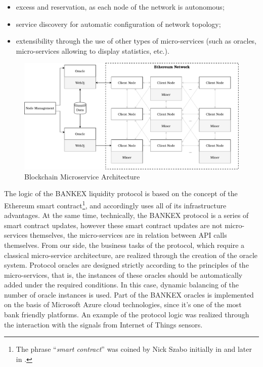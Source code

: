 \documentclass{article}
\begin{document}
\begin{multicols}{2}
\begin{itemize}
\item excess and reservation, as each node of the network is autonomous;
\item service discovery for automatic configuration of network topology;
\item extensibility through the use of other types of micro-services (such as oracles, micro-services allowing to display statistics, etc.).
\end{itemize}

\begin{figure}
  \centering
  \includegraphics[width=\textwidth]{blockchain-microservice-architecture.pdf}
  \caption{Blockchain Microservice Architecture}
  \label{fig:blockchain-microservice-architecture}
\end{figure}

The logic of the BANKEX liquidity protocol is based on the concept of the Ethereum smart contract\footnote{The phrase \enquote{\textit{smart contract}} was coined by Nick Szabo initially in \cite{szabo1996} and later in \cite{szabo1997}.}, and accordingly uses all of its infrastructure advantages. At the same time, technically, the BANKEX protocol is a series of smart contract updates, however these smart contract updates are not micro-services themselves, the micro-services are in relation between API calls themselves. From our side, the business tasks of the protocol, which require a classical micro-service architecture, are realized through the creation of the oracle system. Protocol oracles are designed strictly according to the principles of the micro-services, that is, the instances of these oracles should be automatically added under the required conditions. In this case, dynamic balancing of the number of oracle instances is used. Part of the BANKEX oracles is implemented on the basis of Microsoft Azure cloud technologies, since it's one of the most bank friendly platforms. An example of the protocol logic was realized through the interaction with the signals from Internet of Things sensors.


\end{multicols}
\end{document}
